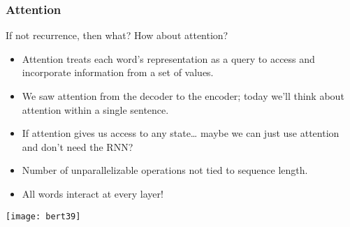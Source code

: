 \begin{frame}[fragile]\frametitle{Attention}

If not recurrence, then what? How about attention?

\begin{itemize}
\item Attention treats each word’s representation as a query to access and  incorporate information from a set of values.
\item We saw attention from the decoder to the encoder; today we’ll think about
attention within a single sentence.
\item If attention gives us access to any state… maybe we can just use attention and don’t need the RNN?
\item Number of unparallelizable operations not tied to sequence length.
\item All words interact at every layer!

\end{itemize}	 

\begin{center}
\texttt{[image: bert39]}
\end{center}	

 
\end{frame}

